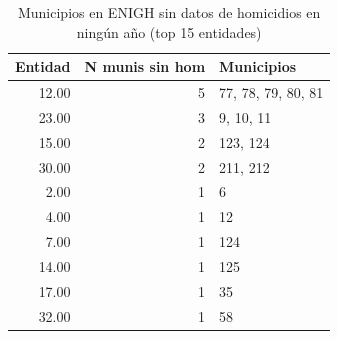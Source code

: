 \begin{table}[ht]
\centering
\caption{Municipios en ENIGH sin datos de homicidios en ning\'un a\~{n}o (top 15 entidades)} 
\label{tab:08b_munis_sin_hom_nunca}
\begin{tabular}{rrl}
  \toprule
Entidad & N munis sin hom & Municipios \\ 
  \midrule
12.00 &   5 & 77, 78, 79, 80, 81 \\ 
  23.00 &   3 & 9, 10, 11 \\ 
  15.00 &   2 & 123, 124 \\ 
  30.00 &   2 & 211, 212 \\ 
  2.00 &   1 & 6 \\ 
  4.00 &   1 & 12 \\ 
  7.00 &   1 & 124 \\ 
  14.00 &   1 & 125 \\ 
  17.00 &   1 & 35 \\ 
  32.00 &   1 & 58 \\ 
   \bottomrule
\end{tabular}
\end{table}
